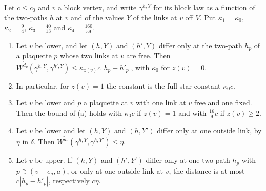 \begin{lemma}\label{lem:partial}
Let $c\le c_0$ and $v$ a block vertex, and write $\gamma^{h,Y}$ for its block
law as a function of the two-paths $h$ at $v$ and of the values $Y$ of the
links at $v$ off $V$. Put $\kappa_1=\kappa_0$, $\kappa_2=\frac94$,
$\kappa_3=\frac{40}{13}$ and $\kappa_4=\frac{160}{59}$.
\begin{enumerate}[label=\textup{(\alph*)},leftmargin=*]
\item Let $v$ be lower, and let $(h,Y)$ and $(h',Y)$ differ only at the
two-path $h_p$ of a plaquette $p$ whose two links at $v$ are free. Then
$W^{\tilde d_v}(\gamma^{h,Y},\gamma^{h',Y})\le\kappa_{z(v)}c\,|h_p-h'_p|$, with
$\kappa_0$ for $z(v)=0$.
\item In particular, for $z(v)=1$ the constant is the full-star constant
$\kappa_0c$.
\item Let $v$ be lower and $p$ a plaquette at $v$ with one link at $v$ free and
one fixed. Then the bound of \textup{(a)} holds with $\kappa_0c$ if $z(v)=1$
and with $\frac{16}9c$ if $z(v)\ge2$.
\item Let $v$ be lower and let $(h,Y)$ and $(h,Y')$ differ only at one
outside link, by $\eta$ in $\delta$. Then $W^{\tilde d_v}(\gamma^{h,Y},
\gamma^{h,Y'})\le\eta$.
\item Let $v$ be upper. If $(h,Y)$ and $(h',Y')$ differ only at one two-path
$h_p$ with $p\ni(v-e_a,a)$, or only at one outside link at $v$, the distance is
at most $c|h_p-h'_p|$, respectively $c\eta$.
\end{enumerate}
\end{lemma}

